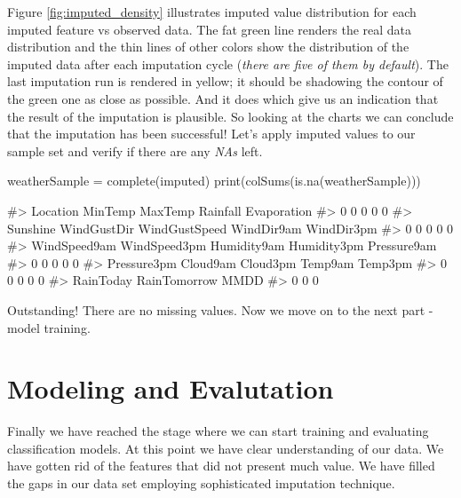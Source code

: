 Figure \ref{fig:imputed_density} illustrates imputed value distribution
for each imputed feature vs observed data. The fat green line renders
the real data distribution and the thin lines of other colors show the
distribution of the imputed data after each imputation cycle
(\emph{there are five of them by default}). The last imputation run is
rendered in yellow; it should be shadowing the contour of the green one
as close as possible. And it does which give us an indication that the
result of the imputation is plausible. So looking at the charts we can
conclude that the imputation has been successful! Let's apply imputed
values to our sample set and verify if there are any \emph{NAs} left.

\begin{Schunk}
\begin{Sinput}
weatherSample = complete(imputed)
print(colSums(is.na(weatherSample)))
\end{Sinput}
\begin{Soutput}
#>      Location       MinTemp       MaxTemp      Rainfall   Evaporation 
#>             0             0             0             0             0 
#>      Sunshine   WindGustDir WindGustSpeed    WindDir9am    WindDir3pm 
#>             0             0             0             0             0 
#>  WindSpeed9am  WindSpeed3pm   Humidity9am   Humidity3pm   Pressure9am 
#>             0             0             0             0             0 
#>   Pressure3pm      Cloud9am      Cloud3pm       Temp9am       Temp3pm 
#>             0             0             0             0             0 
#>     RainToday  RainTomorrow          MMDD 
#>             0             0             0
\end{Soutput}
\end{Schunk}

Outstanding! There are no missing values. Now we move on to the next
part - model training.

\hypertarget{modeling-and-evalutation}{%
\section{Modeling and Evalutation}\label{modeling-and-evalutation}}

Finally we have reached the stage where we can start training and
evaluating classification models. At this point we have clear
understanding of our data. We have gotten rid of the features that did
not present much value. We have filled the gaps in our data set
employing sophisticated imputation technique.

